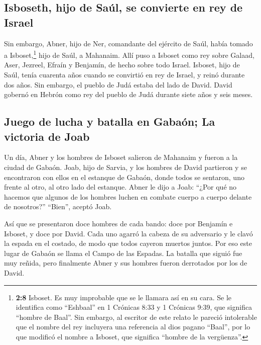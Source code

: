 \hypertarget{isboseth-hijo-de-sauxfal-se-convierte-en-rey-de-israel}{%
\subsection{Isboseth, hijo de Saúl, se convierte en rey de
Israel}\label{isboseth-hijo-de-sauxfal-se-convierte-en-rey-de-israel}}

 Sin embargo, Abner, hijo de Ner, comandante del ejército
de Saúl, había tomado a Isboset,\footnote{\textbf{2:8} Isboset. Es muy
  improbable que se le llamara así en su cara. Se le identifica como
  ``Eshbaal'' en 1 Crónicas 8:33 y 1 Crónicas 9:39, que significa
  ``hombre de Baal''. Sin embargo, al escritor de este relato le pareció
  intolerable que el nombre del rey incluyera una referencia al dios
  pagano ``Baal'', por lo que modificó el nombre a Isboset, que
  significa ``hombre de la vergüenza''.} hijo de Saúl, a Mahanaim.
 Allí puso a Isboset como rey sobre Galaad, Aser, Jezreel,
Efraín y Benjamín, de hecho sobre todo Israel.  Isboset,
hijo de Saúl, tenía cuarenta años cuando se convirtió en rey de Israel,
y reinó durante dos años. Sin embargo, el pueblo de Judá estaba del lado
de David.  David gobernó en Hebrón como rey del pueblo de
Judá durante siete años y seis meses.

\hypertarget{juego-de-lucha-y-batalla-en-gabauxf3n-la-victoria-de-joab}{%
\subsection{Juego de lucha y batalla en Gabaón; La victoria de
Joab}\label{juego-de-lucha-y-batalla-en-gabauxf3n-la-victoria-de-joab}}

 Un día, Abner y los hombres de Isboset salieron de
Mahanaim y fueron a la ciudad de Gabaón.  Joab, hijo de
Sarvia, y los hombres de David partieron y se encontraron con ellos en
el estanque de Gabaón, donde todos se sentaron, uno frente al otro, al
otro lado del estanque.  Abner le dijo a Joab: ``¿Por qué
no hacemos que algunos de los hombres luchen en combate cuerpo a cuerpo
delante de nosotros?'' ``Bien'', aceptó Joab.

 Así que se presentaron doce hombres de cada bando: doce
por Benjamín e Isboset, y doce por David.  Cada uno
agarró la cabeza de su adversario y le clavó la espada en el costado, de
modo que todos cayeron muertos juntos. Por eso este lugar de Gabaón se
llama el Campo de las Espadas.  La batalla que siguió fue
muy reñida, pero finalmente Abner y sus hombres fueron derrotados por
los de David.

